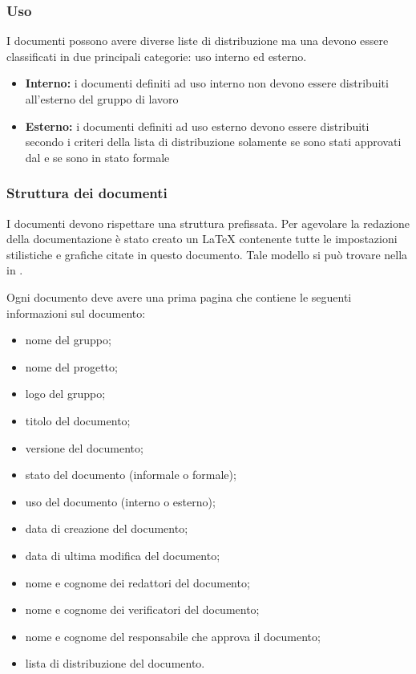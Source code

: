 \documentclass[12pt,a4paper]{article}
\begin{document}
\subsubsection{Uso}
I documenti possono avere diverse liste di distribuzione ma una devono essere classificati in due principali categorie: uso interno ed esterno.

\begin{itemize}
	\item \textbf{Interno:} i documenti definiti ad uso interno non devono essere distribuiti all'esterno del gruppo di lavoro
	\item \textbf{Esterno:} i documenti definiti ad uso esterno devono essere distribuiti secondo i criteri della lista di distribuzione solamente se sono stati approvati dal \PM{} e se sono in stato formale
\end{itemize}

\subsubsection{Struttura dei documenti}
I documenti devono rispettare una struttura prefissata. Per agevolare la redazione della documentazione è stato creato un  \LaTeX{} contenente tutte le impostazioni stilistiche e grafiche citate in questo documento. Tale modello si può trovare nella  in .

Ogni documento deve avere una prima pagina che contiene le seguenti informazioni sul documento:
\begin{itemize}
	\item nome del gruppo;
	\item nome del progetto;
	\item logo del gruppo;
	\item titolo del documento;
	\item versione del documento;
	\item stato del documento (informale o formale);
	\item uso del documento (interno o esterno);
	\item data di creazione del documento;
	\item data di ultima modifica del documento;
	\item nome e cognome dei redattori del documento;
	\item nome e cognome dei verificatori del documento;
	\item nome e cognome del responsabile che approva il documento;
	\item lista di distribuzione del documento.
\end{itemize}
\end{document}

